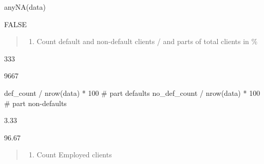 \documentclass[
  letterpaper,
  DIV=11,
  numbers=noendperiod]{scrreprt}
\newenvironment{Shaded}{\begin{snugshade}}{\end{snugshade}}
\newcommand{\CommentTok}[1]{\textcolor[rgb]{0.37,0.37,0.37}{#1}}
\newcommand{\DecValTok}[1]{\textcolor[rgb]{0.68,0.00,0.00}{#1}}
\newcommand{\FunctionTok}[1]{\textcolor[rgb]{0.28,0.35,0.67}{#1}}
\newcommand{\NormalTok}[1]{\textcolor[rgb]{0.00,0.23,0.31}{#1}}
\newcommand{\OtherTok}[1]{\textcolor[rgb]{0.00,0.23,0.31}{#1}}
\newcommand{\SpecialCharTok}[1]{\textcolor[rgb]{0.37,0.37,0.37}{#1}}
\providecommand{\tightlist}{%
  \setlength{\itemsep}{0pt}\setlength{\parskip}{0pt}}\usepackage{longtable,booktabs,array}
\begin{document}
\begin{Shaded}
\begin{Highlighting}[]
\FunctionTok{anyNA}\NormalTok{(data)}
\end{Highlighting}
\end{Shaded}

FALSE

\begin{quote}
\begin{enumerate}
\def\labelenumi{\arabic{enumi}.}
\setcounter{enumi}{1}
\tightlist
\item
  Count default and non-default clients / and parts of total clients in
  \%
\end{enumerate}
\end{quote}

\begin{Shaded}
\end{Shaded}

333

9667

\begin{Shaded}
\begin{Highlighting}[]
\NormalTok{def\_count }\SpecialCharTok{/} \FunctionTok{nrow}\NormalTok{(data) }\SpecialCharTok{*} \DecValTok{100} \CommentTok{\# part defaults}
\NormalTok{no\_def\_count }\SpecialCharTok{/} \FunctionTok{nrow}\NormalTok{(data) }\SpecialCharTok{*} \DecValTok{100} \CommentTok{\# part non{-}defaults}
\end{Highlighting}
\end{Shaded}

3.33

96.67

\begin{quote}
\begin{enumerate}
\def\labelenumi{\arabic{enumi}.}
\setcounter{enumi}{2}
\tightlist
\item
  Count Employed clients
\end{enumerate}
\end{quote}
\end{document}
